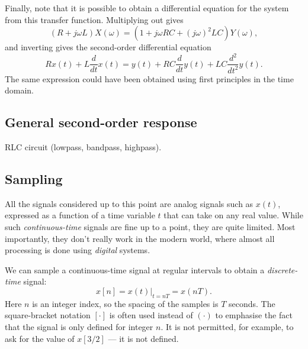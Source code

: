\documentclass[10pt]{beamer}
\begin{document}
Finally, note that it is possible to obtain a differential equation for the system from this transfer function.  Multiplying out gives
\begin{equation*}
  (R + j \omega L) X(\omega) = (1 + j \omega RC + (j \omega)^2 LC) Y(\omega),
\end{equation*}
and inverting gives the second-order differential equation
\begin{equation*}
  R x(t) + L \frac{d}{dt} x(t) = y(t) + RC \frac{d}{dt} y(t) + LC \frac{d^2}{dt^2} y(t).
\end{equation*}
The same expression could have been obtained using first principles in the time domain.

\subsection{General second-order response}
RLC circuit (lowpass, bandpass, highpass).


\subsection{Sampling}

All the signals considered up to this point are analog signals such as $x(t)$, expressed as a function of a time variable $t$ that can take on any real value.  While such {\em continuous-time} signals are fine up to a point, they are quite limited.  Most importantly, they don't really work in the modern world, where almost all processing is done using {\em digital} systems.  

We can sample a continuous-time signal at regular intervals to obtain a {\em discrete-time} signal:
\begin{equation*}
  x[n] = \left. x(t) \right|_{t=nT} = x(nT).
\end{equation*}
Here $n$ is an integer index, so the spacing of the samples is $T$ seconds.  The square-bracket notation $[\cdot]$ is often used instead of $(\cdot)$ to emphasise the fact that the signal is only defined for integer $n$.  It is not permitted, for example, to ask for the value of $x[3/2]$ --- it is not defined.
\end{document}
